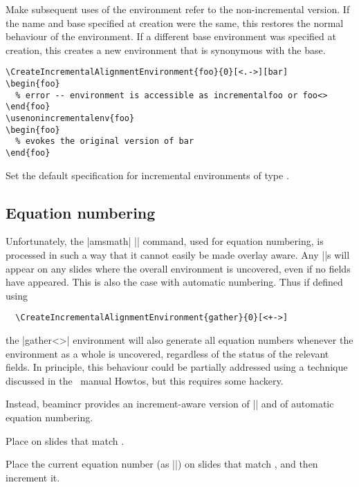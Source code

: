 \documentclass[a4paper]{ltxdoc}
\begin{document}
\begin{command}{{\usenonincrementalenv}}
  Make subsequent uses of the  environment refer to the
  non-incremental version.  If the name and base specified at creation were the
  same, this restores the normal behaviour of the  environment.  If a
  different base environment was specified at creation, this creates a new
   environment that is synonymous with the base.  \example
\begin{verbatim}
\CreateIncrementalAlignmentEnvironment{foo}{0}[<.->][bar]
\begin{foo}
  % error -- environment is accessible as incrementalfoo or foo<>
\end{foo}
\usenonincrementalenv{foo}
\begin{foo}
  % evokes the original version of bar
\end{foo}
\end{verbatim}
\end{command}


\begin{command}{{\setincrementalenvspec}}
  Set the default specification for incremental environments of type .
\end{command}


\subsection{Equation numbering}\label{sec:align:eqnum}

Unfortunately, the |amsmath| |\tag| command, used for equation numbering, is
processed in such a way that it cannot easily be made overlay aware.  Any
|\tag|s will appear on any slides where the overall environment is uncovered,
even if no fields have appeared.  This is also the case with automatic
numbering.  Thus if defined using
\begin{verbatim}
  \CreateIncrementalAlignmentEnvironment{gather}{0}[<+->]
\end{verbatim}
the |gather<>| environment will also generate all equation numbers whenever the
environment as a whole is uncovered, regardless of the status of the relevant
fields.  In principle, this behaviour could be partially addressed using a
technique discussed in the \beamer\ manual Howtos, but this requires some
hackery.

Instead, beamincr provides an increment-aware version of |\tag| and of automatic
equation numbering.
\begin{command}{\eqtag{}}
  Place  on slides that match .  
\end{command}
\begin{command}{\eqnum{}}
  Place the current equation number (as |\theequation|) on slides that match
  , and then increment it.
\end{command}
\end{document}
